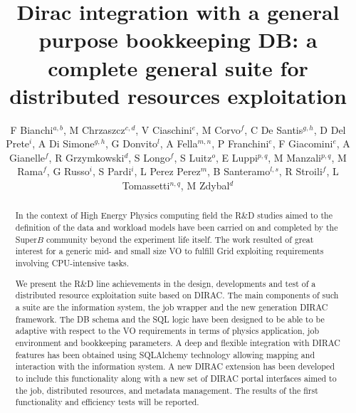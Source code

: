 \documentclass[a4paper]{jpconf}
\begin{document}
\title{Dirac integration with a general purpose bookkeeping DB: a complete general suite for distributed resources exploitation}

\author{F Bianchi$^{a,b}$, M Chrzaszcz$^{c,d}$, V Ciaschini$^e$, M Corvo$^f$, C De Santis$^{g,h}$, D Del Prete$^i$, A Di Simone$^{g,h}$, G Donvito$^l$, A Fella$^{m,n}$, P Franchini$^e$, F Giacomini$^e$, A Gianelle$^f$, R Grzymkowski$^d$, S Longo$^f$, S Luitz$^o$, E Luppi$^{p,q}$, M Manzali$^{p,q}$, M Rama$^f$, G Russo$^i$, S Pardi$^i$, L Perez Perez$^m$, B Santeramo$^{l,s}$, R Stroili$^f$, L Tomassetti$^{n,q}$, M Zdybal$^d$}
\address{$^a$ University of Torino, Turin, Italy}
\address{$^b$ INFN - Sezione di Torino, Turin, Italy}
\address{$^c$ Physik-Institut, Universitat Zurich, Zurich, Switzerland}
\address{$^d$ Henryk Niewodniczanski Institute of Nuclear Physics Polish Academy of Sciences, Krakow, Poland}
\address{$^e$ INFN - CNAF, Bologna, Italy}
\address{$^f$ INFN - Sezione di Padova, Padua, Italy}
\address{$^g$ INFN - Sezione di Roma Tor Vergata, Roma, Italy}
\address{$^h$ Department of Physics, University of Rome Tor Vergata, Rome, Italy}
\address{$^i$ INFN – Sezione di Napoli, Naples, Italy}
\address{$^l$ INFN - Sezione di Bari, Bari, Italy}
\address{$^m$ INFN - Sezione di Pisa, Pisa, Italy}
\address{$^n$ Department of Mathematics and Computer Science, University of Ferrara, Ferrara, Italy}
\address{$^o$ SLAC, USA}
\address{$^p$ Department of Physics, University of Ferrara, Ferrara, Italy}
\address{$^q$ INFN - Sezione di Ferrara, Ferrara, Italy}
\address{$^r$ INFN LNF – Frascati, Italy}
\address{$^s$ Department of Physics, University and Polytechnic of Bari, Bari, Italy}

\begin{abstract}
In the context of High Energy Physics computing field the R\&D studies aimed to
the definition of the data and workload models have been carried on and 
completed by the Super$B$ community beyond the experiment life itself.
The work resulted of great interest for a generic mid- and small size VO to 
fulfill Grid exploiting requirements involving CPU-intensive tasks.

We present the R\&D line achievements in the design, developments and test of a
distributed resource exploitation suite based on DIRAC. The main components of
such a suite are the information system, the job wrapper and the new generation
DIRAC framework. The DB schema and the SQL logic have been designed to be able
to be adaptive with respect to the VO requirements in terms of physics 
application, job environment and bookkeeping parameters. A deep and flexible 
integration with DIRAC features has been obtained using SQLAlchemy technology
allowing mapping and interaction with the information system. A new DIRAC
extension has been developed to include this functionality along with a new set
of DIRAC portal interfaces aimed to the job, distributed resources, and
metadata management. The results of the first functionality and efficiency
tests will be reported.
\end{abstract}
\end{document}
